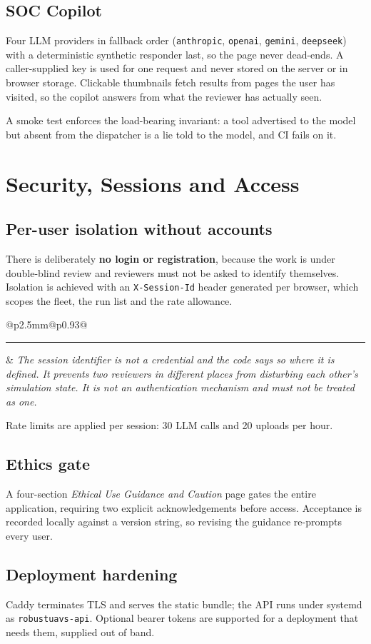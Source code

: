 \documentclass[11pt,a4paper]{article}
\makeatletter
\newcommand{\code}[1]{\texttt{#1}}
\newcommand{\provbox}[1]{%
  \par\medskip\noindent
  \begin{tabular}{@{}p{2.5mm}@{\hspace{3mm}}p{0.93\linewidth}@{}}
  \textcolor{bridgecol}{\rule{2.5mm}{\baselineskip}} & \small\itshape #1
  \end{tabular}\par\medskip}
\makeatother
\begin{document}
\subsection{SOC Copilot}
Four LLM providers in fallback order (\code{anthropic}, \code{openai},
\code{gemini}, \code{deepseek}) with a deterministic synthetic responder last, so
the page never dead-ends. A caller-supplied key is used for one request and
never stored on the server or in browser storage. Clickable thumbnails fetch
results from pages the user has visited, so the copilot answers from what the
reviewer has actually seen.

A smoke test enforces the load-bearing invariant: a tool advertised to the model
but absent from the dispatcher is a lie told to the model, and CI fails on it.

\section{Security, Sessions and Access}

\subsection{Per-user isolation without accounts}
There is deliberately \textbf{no login or registration}, because the work is
under double-blind review and reviewers must not be asked to identify
themselves. Isolation is achieved with an \code{X-Session-Id} header generated
per browser, which scopes the fleet, the run list and the rate allowance.

\provbox{The session identifier is \emph{not} a credential and the code says so
where it is defined. It prevents two reviewers in different places from
disturbing each other's simulation state. It is not an authentication mechanism
and must not be treated as one.}

Rate limits are applied per session: 30 LLM calls and 20 uploads per hour.

\subsection{Ethics gate}
A four-section \emph{Ethical Use Guidance and Caution} page gates the entire
application, requiring two explicit acknowledgements before access. Acceptance
is recorded locally against a version string, so revising the guidance
re-prompts every user.

\subsection{Deployment hardening}
Caddy terminates TLS and serves the static bundle; the API runs under systemd as
\code{robustuavs-api}. Optional bearer tokens are supported for a deployment
that needs them, supplied out of band.
\end{document}

